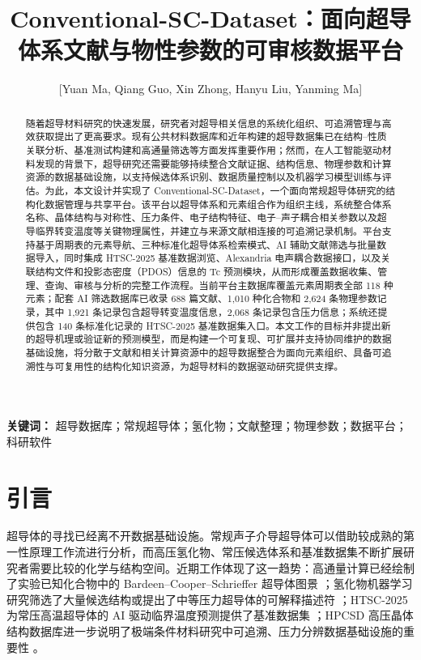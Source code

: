 \documentclass[11pt,a4paper]{ctexart}
\title{Conventional-SC-Dataset：面向超导体系文献与物性参数的可审核数据平台}
\author[1]{[Yuan Ma, Qiang Guo, Xin Zhong, Hanyu Liu, Yanming Ma]}
\affil[1]{[Your Affiliation]}
\date{}
\begin{document}
\maketitle

\begin{abstract}
随着超导材料研究的快速发展，研究者对超导相关信息的系统化组织、可追溯管理与高效获取提出了更高要求。现有公共材料数据库和近年构建的超导数据集已在结构--性质关联分析、基准测试构建和高通量筛选等方面发挥重要作用；然而，在人工智能驱动材料发现的背景下，超导研究还需要能够持续整合文献证据、结构信息、物理参数和计算资源的数据基础设施，以支持候选体系识别、数据质量控制以及机器学习模型训练与评估。为此，本文设计并实现了 Conventional-SC-Dataset，一个面向常规超导体研究的结构化数据管理与共享平台。该平台以超导体系和元素组合作为组织主线，系统整合体系名称、晶体结构与对称性、压力条件、电子结构特征、电子--声子耦合相关参数以及超导临界转变温度等关键物理属性，并建立与来源文献相连接的可追溯记录机制。平台支持基于周期表的元素导航、三种标准化超导体系检索模式、AI 辅助文献筛选与批量数据导入，同时集成 HTSC-2025 基准数据浏览、Alexandria 电声耦合数据接口，以及关联结构文件和投影态密度（PDOS）信息的 Tc 预测模块，从而形成覆盖数据收集、管理、查询、审核与分析的完整工作流程。当前平台主数据库覆盖元素周期表全部 118 种元素；配套 AI 筛选数据库已收录 688 篇文献、1,010 种化合物和 2,624 条物理参数记录，其中 1,921 条记录包含超导转变温度信息，2,068 条记录包含压力信息；系统还提供包含 140 条标准化记录的 HTSC-2025 基准数据集入口。本文工作的目标并非提出新的超导机理或验证新的预测模型，而是构建一个可复现、可扩展并支持协同维护的数据基础设施，将分散于文献和相关计算资源中的超导数据整合为面向元素组织、具备可追溯性与可复用性的结构化知识资源，为超导材料的数据驱动研究提供支撑。
\end{abstract}

\noindent\textbf{关键词：} 超导数据库；常规超导体；氢化物；文献整理；物理参数；数据平台；科研软件

\section{引言}

超导体的寻找已经离不开数据基础设施。常规声子介导超导体可以借助较成熟的第一性原理工作流进行分析，而高压氢化物、常压候选体系和基准数据集不断扩展研究者需要比较的化学与结构空间。近期工作体现了这一趋势：高通量计算已经绘制了实验已知化合物中的 Bardeen--Cooper--Schrieffer 超导体图景 \cite{bercx2025prxenergy}；氢化物机器学习研究筛选了大量候选结构或提出了中等压力超导体的可解释描述符 \cite{pires2026ambient,chen2026descriptors}；HTSC-2025 为常压高温超导体的 AI 驱动临界温度预测提供了基准数据集 \cite{han2025htsc}；HPCSD 高压晶体结构数据库进一步说明了极端条件材料研究中可追溯、压力分辨数据基础设施的重要性 \cite{wang2026hpcsd}。
\end{document}
